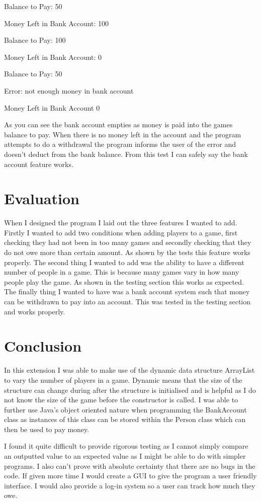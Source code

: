 \documentclass[a4paper]{article}
\begin{document}
\noindent Balance to Pay: 50

\noindent Money Left in Bank Account: 100

\noindent Balance to Pay: 100

\noindent Money Left in Bank Account: 0

\noindent Balance to Pay: 50

\noindent Error: not enough money in bank account

\noindent Money Left in Bank Account 0 \newline

As you can see the bank account empties as money is paid into the games balance to pay. When there is no money left in the account and the program attempts to do a withdrawal the program informs the user of the error and doesn't deduct from the bank balance. From this test I can safely say the bank account feature works. 

\section*{Evaluation}
When I designed the program I laid out the three features I wanted to add. Firstly I wanted to add two conditions when adding players to a game, first checking they had not been in too many games and secondly checking that they do not owe more than certain amount. As shown by the tests this feature works properly. The second thing I wanted to add was the ability to have a different number of people in a game. This is because many games vary in how many people play the game. As shown in the testing section this works as expected. The finally thing I wanted to have was a bank account system such that money can be withdrawn to pay into an account. This was tested in the testing section and works properly.

\section*{Conclusion}
In this extension I was able to make use of the dynamic data structure ArrayList to vary the number of players in a game. Dynamic means that the size of the structure can change during after the structure is initialised and is helpful as I do not know the size of the game before the constructor is called. I was able to further use Java's object oriented nature when programming the BankAccount class as instances of this class can be stored within the Person class which can then be used to pay money.

I found it quite difficult to provide rigorous testing as I cannot simply compare an outputted value to an expected value as I might be able to do with simpler programs. I also can't prove with absolute certainty that there are no bugs in the code. If given more time I would create a GUI to give the program a user friendly interface. I would also provide a log-in system so a user can track how much they owe.
\end{document}
